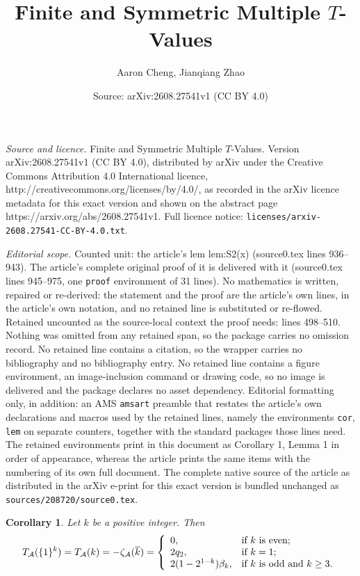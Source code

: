 \documentclass[10pt,a4paper]{amsart}
\title{Finite and Symmetric Multiple $T$-Values}
\author{Aaron Cheng, Jianqiang Zhao}
\date{Source: arXiv:2608.27541v1 (CC BY 4.0)}
\newtheorem{cor}{Corollary}
\newcommand{\calA}{\mathcal{A}}
\newcommand{\ol}{\overline}
\begin{document}
\maketitle

\noindent\emph{Source and licence.} Finite and Symmetric Multiple $T$-Values. Version arXiv:2608.27541v1 (CC BY 4.0), distributed by arXiv under the Creative Commons Attribution 4.0 International licence, http://creativecommons.org/licenses/by/4.0/, as recorded in the arXiv licence metadata for this exact version and shown on the abstract page https://arxiv.org/abs/2608.27541v1. Full licence notice: \texttt{licenses/arxiv-2608.27541-CC-BY-4.0.txt}.\par\smallskip

\noindent\textit{Editorial scope.} Counted unit: the article's lem lem:S2(x) (source0.tex lines 936--943). The article's complete original proof of it is delivered with it (source0.tex lines 945--975, one \texttt{proof} environment of 31 lines). No mathematics is written, repaired or re-derived: the statement and the proof are the article's own lines, in the article's own notation, and no retained line is substituted or re-flowed.  Retained uncounted as the source-local context the proof needs: lines 498--510.  Nothing was omitted from any retained span, so the package carries no omission record.  No retained line contains a citation, so the wrapper carries no bibliography and no bibliography entry.  No retained line contains a figure environment, an image-inclusion command or drawing code, so no image is delivered and the package declares no asset dependency.  Editorial formatting only, in addition: an AMS \texttt{amsart} preamble that restates the article's own declarations and macros used by the retained lines, namely the environments \texttt{cor}, \texttt{lem} on separate counters, together with the standard packages those lines need.  The retained environments print in this document as Corollary 1, Lemma 1 in order of appearance, whereas the article prints the same items with the numbering of its own full document.  The complete native source of the article as distributed in the arXiv e-print for this exact version is bundled unchanged as \texttt{sources/208720/source0.tex}.
\begin{cor}\label{cor:unitT-oddWt}
Let $k$ be a positive integer. Then
\begin{equation*}
T_\calA(\{1\}^k)=T_\calA(k)=-\zeta_\calA(\ol{k})=
\left\{
  \begin{array}{ll}
    0, & \hbox{if $k$ is even;} \\
    2\texttt{q}_2, & \hbox{if $k=1$;} \\
    2(1-2^{1-k})\beta_k, & \hbox{if $k$ is odd and $k\ge 3$.}
  \end{array}
\right.
\end{equation*}
\end{cor}
\end{document}
